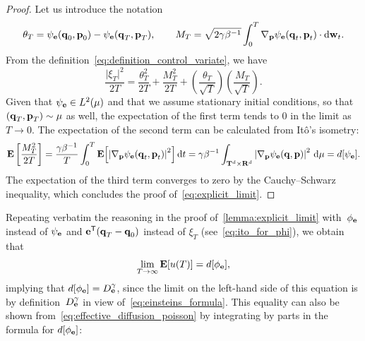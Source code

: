 \documentclass[11pt,a4paper]{article}
\begin{document}
\begin{proof}
    Let us introduce the notation
    \[
        \theta_T = \psi_{\boldsymbol{\mathbf e}}(\boldsymbol{\mathbf q}_0, \boldsymbol{\mathbf p}_0) - \psi_{\boldsymbol{\mathbf e}}(\boldsymbol{\mathbf q}_T, \boldsymbol{\mathbf p}_T),
        \qquad
        M_T = \sqrt{2 \gamma \beta^{-1}} \int_{0}^{T} \nabla_{\boldsymbol{\mathbf p}} \psi_{\boldsymbol{\mathbf e}}(\boldsymbol{\mathbf q}_t, \boldsymbol{\mathbf p}_t) \cdot \mathrm d \boldsymbol{\mathbf w}_t.
    \]
    From the definition~\eqref{eq:definition_control_variate},
    we have
    \[
        \frac{\lvert \xi_T \rvert^2}{2T} = \frac{\theta_T^2}{2T} + \frac{M_T^2}{2T} + \left(\frac{\theta_T}{\sqrt{T}}\right) \left(\frac{M_T}{\sqrt{T}}\right).
    \]
    Given that $\psi_{\boldsymbol{\mathbf e}} \in L^2(\mu)$ and that we assume stationary initial conditions,
    so that $(\boldsymbol{\mathbf q}_T, \boldsymbol{\mathbf p}_T) \sim \mu$ as well,
    the expectation of the first term tends to 0 in the limit as $T \to 0$.
    The expectation of the second term can be calculated from It\^o's isometry:
    \[
        \mathbf{E} \left[ \frac{M_T^2}{2T} \right]
        = \frac{\gamma \beta^{-1}}{T} \int_{0}^{T} \mathbf{E} \Bigl[\left\lvert \nabla_{\boldsymbol{\mathbf p}} \psi_{\boldsymbol{\mathbf e}}(\boldsymbol{\mathbf q}_t, \boldsymbol{\mathbf p}_t) \right\rvert^2\Bigr] \, \mathrm d t
        = \gamma \beta^{-1} \int_{\mathbf T^d \times \mathbf R^d} \left\lvert \nabla_{\boldsymbol{\mathbf p}} \psi_{\boldsymbol{\mathbf e}}(\boldsymbol{\mathbf q}, \boldsymbol{\mathbf p}) \right\rvert^2 \, \mathrm d \mu
        = d[\psi_{\boldsymbol{\mathbf e}}].
    \]
    The expectation of the third term converges to zero by the Cauchy--Schwarz inequality,
    which concludes the proof of~\eqref{eq:explicit_limit}.
\end{proof}
Repeating verbatim the reasoning in the proof of~\cref{lemma:explicit_limit} with~$\phi_{\boldsymbol{\mathbf e}}$ instead of $\psi_{\boldsymbol{\mathbf e}}$ and $\boldsymbol{\mathbf e}^\mathsf T (\boldsymbol{\mathbf q}_T - \boldsymbol{\mathbf q}_0)$ instead of $\xi_T$
(see~\eqref{eq:ito_for_phi}),
we obtain that
\[
    \lim_{T \to \infty} \mathbf{E} [u(T)] = d[\phi_{\boldsymbol{\mathbf e}}],
\]
implying that $d[\phi_{\boldsymbol{\mathbf e}}] = D^{\gamma}_{\boldsymbol{\mathbf e}}$,
since the limit on the left-hand side of this equation is by definition~$D^{\gamma}_{\boldsymbol{\mathbf e}}$ in view of~\eqref{eq:einsteins_formula}.
This equality can also be shown from~\eqref{eq:effective_diffusion_poisson} by integrating by parts in the formula for $d[\phi_{\boldsymbol{\mathbf e}}]$:
\end{document}
